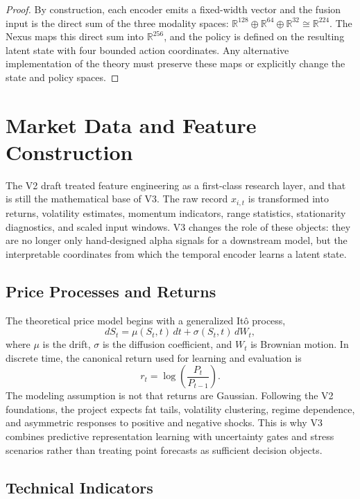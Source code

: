 \documentclass[10pt]{article}
\newcommand{\R}{\mathbb{R}}
\begin{document}
\begin{proof}
	By construction, each encoder emits a fixed-width vector and the fusion input is the direct
	sum of the three modality spaces:
	\(\R^{128}\oplus\R^{64}\oplus\R^{32}\cong\R^{224}\). The Nexus maps this direct sum into
	\(\R^{256}\), and the policy is defined on the resulting latent state with four bounded
	action coordinates. Any alternative implementation of the theory must preserve these maps or
	explicitly change the state and policy spaces.
\end{proof}

\section{Market Data and Feature Construction}

The V2 draft treated feature engineering as a first-class research layer, and that is still
the mathematical base of V3. The raw record \(x_{i,t}\) is transformed into returns,
volatility estimates, momentum indicators, range statistics, stationarity diagnostics, and
scaled input windows. V3 changes the role of these objects: they are no longer only
hand-designed alpha signals for a downstream model, but the interpretable coordinates from
which the temporal encoder learns a latent state.

\subsection{Price Processes and Returns}

The theoretical price model begins with a generalized Itô process,
\[
	dS_t = \mu(S_t,t)\,dt + \sigma(S_t,t)\,dW_t,
\]
where \(\mu\) is the drift, \(\sigma\) is the diffusion coefficient, and \(W_t\) is Brownian
motion. In discrete time, the canonical return used for learning and evaluation is
\[
	r_t=\log\left(\frac{P_t}{P_{t-1}}\right).
\]
The modeling assumption is not that returns are Gaussian. Following the V2 foundations, the
project expects fat tails, volatility clustering, regime dependence, and asymmetric responses
to positive and negative shocks. This is why V3 combines predictive representation learning
with uncertainty gates and stress scenarios rather than treating point forecasts as sufficient
decision objects.

\subsection{Technical Indicators}
\end{document}
